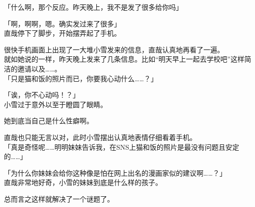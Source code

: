 「什么啊，那个反应。昨天晚上，我不是发了很多给你吗」

「啊，啊啊，嗯。确实发过来了很多」\\

直哉停下了脚步，开始摆弄起了手机。

很快手机画面上出现了一大堆小雪发来的信息，直哉认真地再看了一遍。\\

就如她说的一样，昨天晚上发来了几条信息。比如“明天早上一起去学校吧”这样简洁的邀请以及……。\\

「只是猫和饭的照片而已，你要我心动什么……？」

「诶，你不心动吗！？」\\

小雪过于意外以至于瞪圆了眼睛。

她到底当自己是什么性癖啊。

直哉也只能无言以对，此时小雪摆出认真地表情仔细看着手机。\\

「真是奇怪呢……明明妹妹告诉我，在SNS上猫和饭的照片是最没有问题且安定的……」

「为什么你妹妹会给你这种像是怕在网上出名的漫画家似的建议啊……？」\\

直哉非常地好奇，小雪的妹妹到底是什么样的孩子。

总而言之这样就解决了一个谜题了。\\

